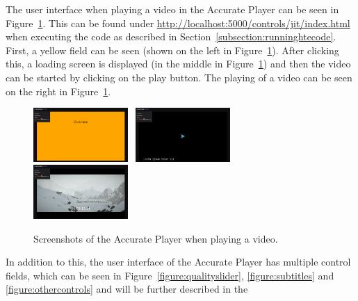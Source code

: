 \documentclass[../MasterThesis.tex]{subfiles}
\begin{document}
\hypersetup{urlcolor=black}
The user interface when playing a video in the Accurate Player can be seen in Figure~\ref{figure:AV_before}. This can be found under \url{http://localhost:5000/controls/jit/index.html} when executing the code as described in Section~\ref{subsection:runninghtecode}.
First, a yellow field can be seen (shown on the left in Figure~\ref{figure:AV_before}). After clicking this, a loading screen is displayed (in the middle in Figure~\ref{figure:AV_before}) and then the video can be started by clicking on the play button. The playing of a video can be seen on the right in Figure~\ref{figure:AV_before}.


\begin{figure}[H]
	\begin{center}
		\includegraphics[width=0.32\textwidth]{AV1_before.png} \ 
		\includegraphics[width=0.32\textwidth]{AV2_before.png} \ 
		\includegraphics[width=0.32\textwidth]{AV3_before.png}
		\caption[Screenshots of the frontend.]{Screenshots of the Accurate Player when playing a video.}
		\label{figure:AV_before}
	\end{center}
\end{figure}
%
%
%
%
%
%
%
%
%
\sodef{}
%
In addition to this, the user interface of the Accurate Player has multiple control fields, which can be seen in Figure~\ref{figure:qualityslider}, \ref{figure:subtitles} and \ref{figure:othercontrols} and will be further described in the 
%
\end{document}

